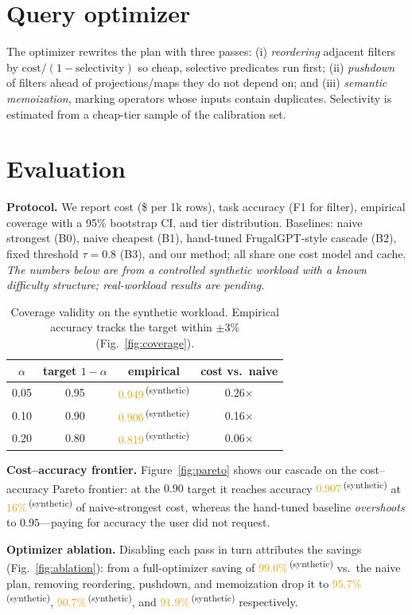 \documentclass[10pt,twocolumn]{article}
\newcommand{\synthetic}[1]{\textcolor{orange}{#1}\,\textsuperscript{(synthetic)}}
\begin{document}
\section{Query optimizer}\label{sec:optimizer}
The optimizer rewrites the plan with three passes: (i) \emph{reordering} adjacent filters
by $\text{cost}/(1-\text{selectivity})$ so cheap, selective predicates run first;
(ii) \emph{pushdown} of filters ahead of projections/maps they do not depend on; and
(iii) \emph{semantic memoization}, marking operators whose inputs contain duplicates.
Selectivity is estimated from a cheap-tier sample of the calibration set.

\section{Evaluation}\label{sec:eval}
\textbf{Protocol.} We report cost (\$ per 1k rows), task accuracy (F1 for filter),
empirical coverage with a 95\% bootstrap CI, and tier distribution. Baselines: naive
strongest (B0), naive cheapest (B1), hand-tuned FrugalGPT-style cascade (B2), fixed
threshold $\tau{=}0.8$ (B3), and our method; all share one cost model and cache.
\emph{The numbers below are from a controlled synthetic workload with a known
difficulty structure; real-workload results are pending.}

\begin{table}[t]\centering\small
\caption{Coverage validity on the synthetic workload. Empirical accuracy tracks the target
within $\pm3\%$ (Fig.~\ref{fig:coverage}).}
\label{tab:coverage}
\begin{tabular}{cccc}
\toprule
$\alpha$ & target $1-\alpha$ & empirical & cost vs.\ naive\\
\midrule
0.05 & 0.95 & \synthetic{0.949} & 0.26$\times$\\
0.10 & 0.90 & \synthetic{0.906} & 0.16$\times$\\
0.20 & 0.80 & \synthetic{0.819} & 0.06$\times$\\
\bottomrule
\end{tabular}
\end{table}

\textbf{Cost--accuracy frontier.} Figure~\ref{fig:pareto} shows our cascade on the
cost--accuracy Pareto frontier: at the $0.90$ target it reaches accuracy
\synthetic{$0.907$} at \synthetic{$16\%$} of naive-strongest cost, whereas the hand-tuned
baseline \emph{overshoots} to $0.95$---paying for accuracy the user did not request.

\textbf{Optimizer ablation.} Disabling each pass in turn attributes the savings
(Fig.~\ref{fig:ablation}): from a full-optimizer saving of \synthetic{$99.0\%$} vs.\ the
naive plan, removing reordering, pushdown, and memoization drop it to
\synthetic{$95.7\%$}, \synthetic{$90.7\%$}, and \synthetic{$91.9\%$} respectively.
\end{document}
